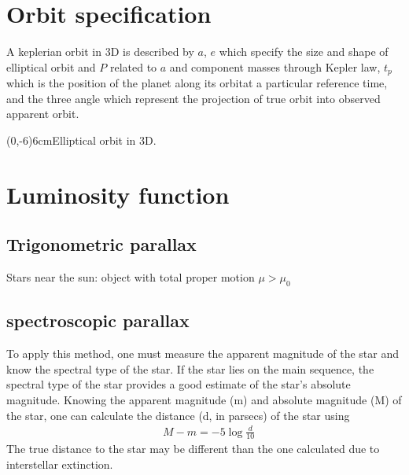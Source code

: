 \documentclass[main.tex]{subfiles}
\begin{document}
\section{Orbit specification}

A keplerian orbit in 3D is described by $a$, $e$ which specify the size and shape of elliptical orbit and $P$ related to $a$ and component masses through Kepler law, $t_p$ which is the position of the planet along its orbitat a particular reference time, and the three angle  which represent the projection of true orbit into observed apparent orbit.



{(0,-6)}{6cm}{Elliptical orbit in 3D.}

\section{Luminosity function} 

\subsection{Trigonometric parallax}

Stars near the sun: object with total proper motion $\mu>\mu_0$

\subsection{spectroscopic parallax}

To apply this method, one must measure the apparent magnitude of the star and know the spectral type of the star. If the star lies on the main sequence, the spectral type of the star provides a good estimate of the star's absolute magnitude. Knowing the apparent magnitude (m) and absolute magnitude (M) of the star, one can calculate the distance (d, in parsecs) of the star using
\begin{align*}
&M − m = − 5\log{\frac{d}{10}}    
\end{align*}
The true distance to the star may be different than the one calculated due to interstellar extinction.
\end{document}
